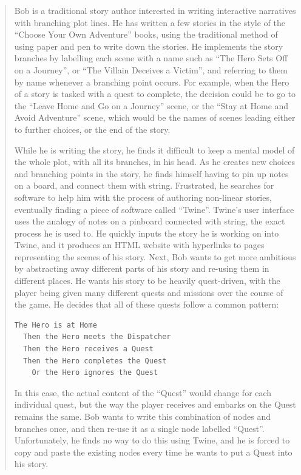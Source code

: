 \documentclass[11pt]{report}
\begin{document}
\begin{quote}
  Bob is a traditional story author interested in writing interactive narratives
  with branching plot lines. He has written a few stories in the style of the
  ``Choose Your Own Adventure'' books, using the traditional method of using paper and
  pen to write down the stories. He implements the story branches by labelling
  each scene with a name such as ``The Hero Sets Off on a Journey'', or ``The
  Villain Deceives a Victim'', and referring to them by name whenever a
  branching point occurs. For example, when the Hero of a story is tasked with a
  quest to complete, the decision could be to go to the ``Leave Home and Go on a
  Journey'' scene, or the ``Stay at Home and Avoid Adventure'' scene, which
  would be the names of scenes leading either to further choices, or the end of
  the story.

  While he is writing the story, he finds it difficult to keep a mental model of
  the whole plot, with all its branches, in his head. As he creates new choices
  and branching points in the story, he finds himself having to pin up notes on
  a board, and connect them with string.
  Frustrated, he searches for software to help him with the process of authoring
  non-linear stories, eventually finding a piece of software called ``Twine''.
  Twine's user interface uses the analogy of notes on a pinboard connected with
  string, the exact process he is used to. He quickly inputs the story he is
  working on into Twine, and it produces an HTML website with hyperlinks to
  pages representing the scenes of his story.
  Next, Bob wants to get more ambitious by abstracting away different parts of
  his story and re-using them in different places. He wants his story to be
  heavily quest-driven, with the player being given many different quests and
  missions over the course of the game. He decides that all of these quests
  follow a common pattern:

  \begin{lstlisting}[showstringspaces=false]
  The Hero is at Home
  Then the Hero meets the Dispatcher
  Then the Hero receives a Quest
  Then the Hero completes the Quest
    Or the Hero ignores the Quest
\end{lstlisting}

  In this case, the actual content of the ``Quest'' would change for each
  individual quest, but the way the player receives and embarks on the Quest
  remains the same. Bob wants to write this combination of nodes and branches
  once, and then re-use it as a single node labelled ``Quest''. Unfortunately,
  he finds no way to do this using Twine, and he is forced to copy and paste the
  existing nodes every time he wants to put a Quest into his story.
\end{quote}
\end{document}
